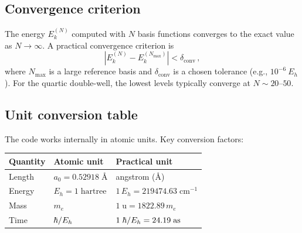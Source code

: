 \subsection{Convergence criterion}

The energy $E_k^{(N)}$ computed with $N$ basis functions converges to the exact
value as $N\to\infty$. A practical convergence criterion is
\begin{equation}
  |E_k^{(N)} - E_k^{(N_{\max})}| < \delta_{\text{conv}}\,,
\end{equation}
where $N_{\max}$ is a large reference basis and $\delta_{\text{conv}}$ is a chosen
tolerance (e.g., $10^{-6}~E_h$). For the quartic double-well, the lowest levels
typically converge at $N \sim 20$--$50$.

\subsection{Unit conversion table}

The code works internally in atomic units. Key conversion factors:
\begin{center}
\renewcommand{\arraystretch}{1.3}
\begin{tabular}{lll}
  \toprule
  Quantity & Atomic unit & Practical unit \\
  \midrule
  Length   & $a_0 = 0.52918\;\text{\AA}$ & angstrom (\AA) \\
  Energy   & $E_h = 1\;\text{hartree}$   & $1\,E_h = 219474.63\;\text{cm}^{-1}$ \\
  Mass     & $m_e$                        & $1\;\text{u} = 1822.89\,m_e$ \\
  Time     & $\hbar/E_h$                    & $1\;\hbar/E_h = 24.19\;\text{as}$ \\
  \bottomrule
\end{tabular}
\end{center}


